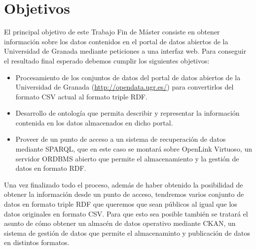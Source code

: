 \chapter{Objetivos}

El principal objetivo de este Trabajo Fin de Máster consiste en obtener información sobre los datos contenidos en el portal de datos abiertos de la Universidad de Granada mediante peticiones a una interfaz web. Para conseguir el resultado final esperado debemos cumplir los siguientes objetivos:

\begin{itemize}
	\item Procesamiento de los conjuntos de datos del portal de datos abiertos de la Universidad de Granada (\url{http://opendata.ugr.es/}) para convertirlos del formato CSV actual al formato triple RDF.
	\item Desarrollo de ontología que permita describir y representar la información contenida en los datos almacenados en dicho portal.
	\item Proveer de un punto de acceso a un sistema de recuperación de datos mediante SPARQL, que en este caso se montará sobre OpenLink Virtuoso, un servidor ORDBMS abierto que permite el almacenamiento y la gestión de datos en formato RDF.
\end{itemize}

Una vez finalizado todo el proceso, además de haber obtenido la posibilidad de obtener la información desde un punto de acceso, tendremos varios conjunto de datos en formato triple RDF que queremos que sean públicos al igual que los datos originales en formato CSV. Para que esto sea posible también se tratará el asunto de cómo obtener un almacén de datos operativo mediante CKAN, un sistema de gestión de datos que permite el almacenaminto y publicación de datos en distintos formatos.